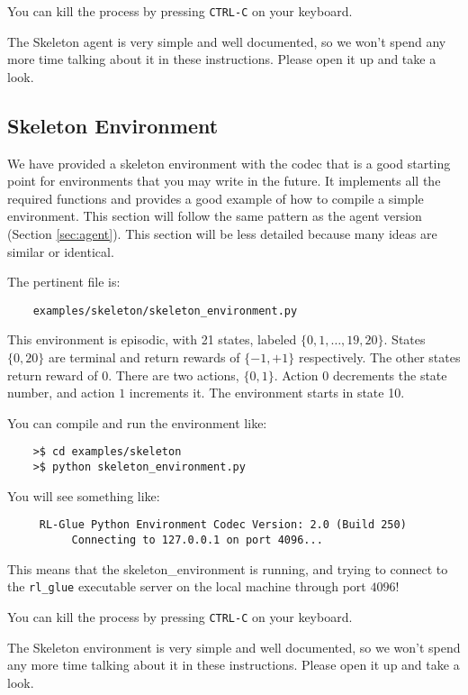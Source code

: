 \documentclass[11pt]{article}
\begin{document}
You can kill the process by pressing \texttt{CTRL-C} on your keyboard.

The Skeleton agent is very simple and well documented, so we won't spend any more time talking about it in these instructions.
Please open it up and take a look.

\subsection{Skeleton Environment}
\label{sec:env}
We have provided a skeleton environment with the codec that is a good starting point for environments that you may write in the future.
It implements all the required functions and provides a good example of how to compile a simple environment.  This section will follow the same 
pattern as the agent version (Section \ref{sec:agent}).  This section will be less detailed because many ideas are similar or identical.

The pertinent file is:
\begin{verbatim}
	examples/skeleton/skeleton_environment.py
\end{verbatim}

This environment is episodic, with 21 states, labeled $\{0, 1,\ldots,19,20\}$. States $\{0, 20\}$ are terminal and return rewards of $\{-1, +1\}$ respectively.  The other states return reward of $0$.
There are two actions, $\{0, 1\}$.  Action $0$ decrements the state number, and action $1$ increments it. The environment starts in state 10.

You can compile and run the environment like:
\begin{verbatim}
	>$ cd examples/skeleton
	>$ python skeleton_environment.py
\end{verbatim}

You will see something like:
\begin{verbatim}
     RL-Glue Python Environment Codec Version: 2.0 (Build 250)
          Connecting to 127.0.0.1 on port 4096...
\end{verbatim}

This means that the skeleton\_environment is running, and trying to connect to the \texttt{rl\_glue} executable server on the local machine through port $4096$! 

You can kill the process by pressing \texttt{CTRL-C} on your keyboard.


The Skeleton environment is very simple and well documented, so we won't spend any more time talking about it in these instructions.
Please open it up and take a look.
\end{document}
